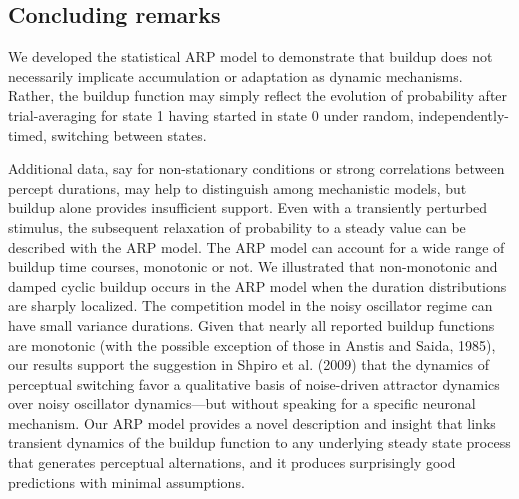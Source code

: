 \subsection{Concluding remarks}

We developed the statistical ARP model to demonstrate that buildup does not necessarily implicate accumulation or adaptation as dynamic mechanisms. Rather, the buildup function may simply reflect the evolution of probability after trial-averaging for state 1 having started in state 0 under random, independently-timed, switching between states. 

Additional data, say for non-stationary conditions or strong correlations between percept durations, may help to distinguish among mechanistic models, but buildup alone provides insufficient support. Even with a transiently perturbed stimulus, the subsequent relaxation of probability to a steady value can be described with the ARP model. The ARP model can account for a wide range of buildup time courses, monotonic or not. We illustrated that non-monotonic and damped cyclic buildup occurs in the ARP model when the duration distributions are sharply localized. The competition model in the noisy oscillator regime can have small variance durations. Given that nearly all reported buildup functions are monotonic (with the possible exception of those in Anstis and Saida, 1985), our results support the suggestion in Shpiro et al. (2009) that the dynamics of perceptual switching favor a qualitative basis of noise-driven attractor dynamics over noisy oscillator dynamics—but without speaking for a specific neuronal mechanism. Our ARP model provides a novel description and insight that links transient dynamics of the buildup function to any underlying steady state process that generates perceptual alternations, and it produces surprisingly good predictions with minimal assumptions.

